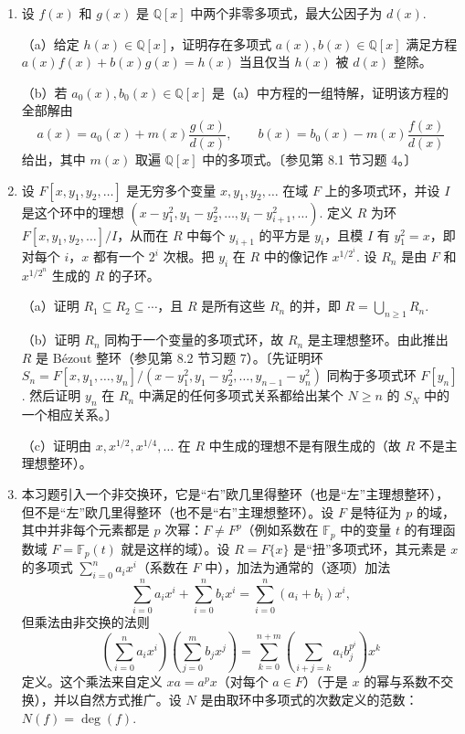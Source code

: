 \begin{enumerate}
\item 设 \(f(x)\) 和 \(g(x)\) 是 \(\mathbb{Q}[x]\) 中两个非零多项式，最大公因子为 \(d(x)\).

（a）给定 \(h(x) \in \mathbb{Q}[x]\)，证明存在多项式 \(a(x), b(x) \in \mathbb{Q}[x]\) 满足方程 \(a(x)f(x) + b(x)g(x) = h(x)\) 当且仅当 \(h(x)\) 被 \(d(x)\) 整除。

（b）若 \(a_0(x), b_0(x) \in \mathbb{Q}[x]\) 是（a）中方程的一组特解，证明该方程的全部解由
\[
a(x) = a_0(x) + m(x)\frac{g(x)}{d(x)}, \qquad b(x) = b_0(x) - m(x)\frac{f(x)}{d(x)}
\]
给出，其中 \(m(x)\) 取遍 \(\mathbb{Q}[x]\) 中的多项式。〔参见第 8.1 节习题 4。〕

\item 设 \(F[x, y_1, y_2, \ldots]\) 是无穷多个变量 \(x, y_1, y_2, \ldots\) 在域 \(F\) 上的多项式环，并设 \(I\) 是这个环中的理想 \((x-y_1^2, y_1-y_2^2, \ldots, y_i-y_{i+1}^2, \ldots)\). 定义 \(R\) 为环 \(F[x, y_1, y_2, \ldots]/I\)，从而在 \(R\) 中每个 \(y_{i+1}\) 的平方是 \(y_i\)，且模 \(I\) 有 \(y_1^2 = x\)，即对每个 \(i\)，\(x\) 都有一个 \(2^i\) 次根。把 \(y_i\) 在 \(R\) 中的像记作 \(x^{1/2^i}\). 设 \(R_n\) 是由 \(F\) 和 \(x^{1/2^n}\) 生成的 \(R\) 的子环。

（a）证明 \(R_1 \subseteq R_2 \subseteq \cdots\)，且 \(R\) 是所有这些 \(R_n\) 的并，即 \(R = \bigcup_{n \geq 1} R_n\).

（b）证明 \(R_n\) 同构于一个变量的多项式环，故 \(R_n\) 是主理想整环。由此推出 \(R\) 是 Bézout 整环（参见第 8.2 节习题 7）。〔先证明环 \(S_n = F[x, y_1, \ldots, y_n]/(x-y_1^2, y_1-y_2^2, \ldots, y_{n-1}-y_n^2)\) 同构于多项式环 \(F[y_n]\). 然后证明 \(y_n\) 在 \(R_n\) 中满足的任何多项式关系都给出某个 \(N \geq n\) 的 \(S_N\) 中的一个相应关系。〕

（c）证明由 \(x, x^{1/2}, x^{1/4}, \ldots\) 在 \(R\) 中生成的理想不是有限生成的（故 \(R\) 不是主理想整环）。

\item 本习题引入一个非交换环，它是“右”欧几里得整环（也是“左”主理想整环），但不是“左”欧几里得整环（也不是“右”主理想整环）。设 \(F\) 是特征为 \(p\) 的域，其中并非每个元素都是 \(p\) 次幂：\(F \neq F^p\)（例如系数在 \(\mathbb{F}_p\) 中的变量 \(t\) 的有理函数域 \(F = \mathbb{F}_p(t)\) 就是这样的域）。设 \(R = F\{x\}\) 是“扭”多项式环，其元素是 \(x\) 的多项式 \(\sum_{i=0}^n a_ix^i\)（系数在 \(F\) 中），加法为通常的（逐项）加法
\[
\sum_{i=0}^n a_ix^i + \sum_{i=0}^n b_ix^i = \sum_{i=0}^n (a_i+b_i)x^i,
\]
但乘法由非交换的法则
\[
\left(\sum_{i=0}^n a_ix^i\right)\left(\sum_{j=0}^m b_jx^j\right) = \sum_{k=0}^{n+m}\left(\sum_{i+j=k} a_ib_j^{p^i}\right)x^k
\]
定义。这个乘法来自定义 \(xa = a^px\)（对每个 \(a \in F\)）（于是 \(x\) 的幂与系数不交换），并以自然方式推广。设 \(N\) 是由取环中多项式的次数定义的范数：\(N(f) = \deg(f)\).


\end{enumerate}
